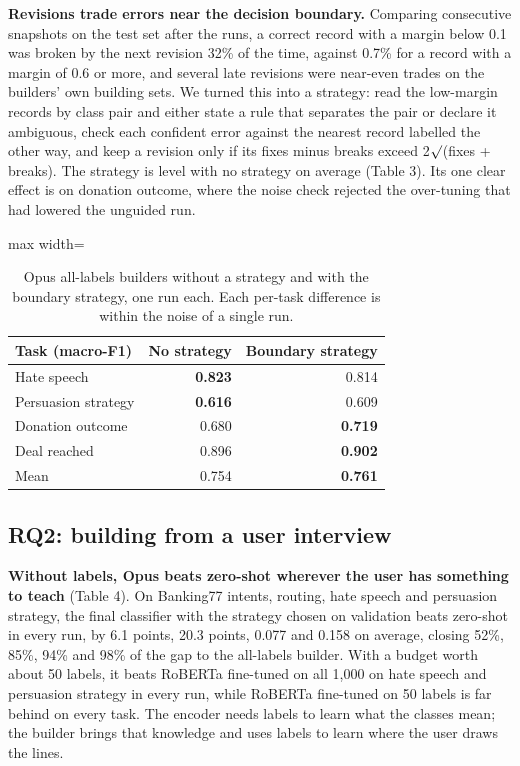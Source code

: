 \documentclass[11pt]{article}
\begin{document}
\textbf{Revisions trade errors near the decision boundary.} Comparing consecutive snapshots on the test set after the runs, a correct record with a margin below 0.1 was broken by the next revision 32\% of the time, against 0.7\% for a record with a margin of 0.6 or more, and several late revisions were near-even trades on the builders' own building sets. We turned this into a strategy: read the low-margin records by class pair and either state a rule that separates the pair or declare it ambiguous, check each confident error against the nearest record labelled the other way, and keep a revision only if its fixes minus breaks exceed 2$\surd$(fixes + breaks). The strategy is level with no strategy on average (Table 3). Its one clear effect is on donation outcome, where the noise check rejected the over-tuning that had lowered the unguided run.

\begin{table}[t]
\centering\small
\begin{adjustbox}{max width=\linewidth}
\begin{tabular}{lrr}
\toprule
Task (macro-F1) & No strategy & Boundary strategy \\
\midrule
Hate speech & \textbf{0.823} & 0.814 \\
Persuasion strategy & \textbf{0.616} & 0.609 \\
Donation outcome & 0.680 & \textbf{0.719} \\
Deal reached & 0.896 & \textbf{0.902} \\
Mean & 0.754 & \textbf{0.761} \\
\bottomrule
\end{tabular}
\end{adjustbox}
\caption{Opus all-labels builders without a strategy and with the boundary strategy, one run each. Each per-task difference is within the noise of a single run.}
\label{tab:3}
\end{table}

\subsection{RQ2: building from a user interview}

\textbf{Without labels, Opus beats zero-shot wherever the user has something to teach} (Table 4). On Banking77 intents, routing, hate speech and persuasion strategy, the final classifier with the strategy chosen on validation beats zero-shot in every run, by 6.1 points, 20.3 points, 0.077 and 0.158 on average, closing 52\%, 85\%, 94\% and 98\% of the gap to the all-labels builder. With a budget worth about 50 labels, it beats RoBERTa fine-tuned on all 1,000 on hate speech and persuasion strategy in every run, while RoBERTa fine-tuned on 50 labels is far behind on every task. The encoder needs labels to learn what the classes mean; the builder brings that knowledge and uses labels to learn where the user draws the lines.
\end{document}
